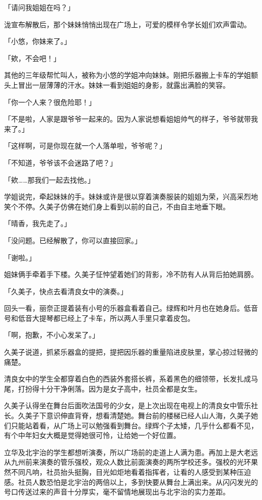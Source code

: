 \documentclass[UTF8]{ctexart}
\begin{document}
    「请问我姐姐在吗？」 

    泷宣布解散后，那个妹妹悄悄出现在广场上，可爱的模样令学长姐们欢声雷动。 

    「小悠，你妹来了。」 

    「欸，不会吧！」 

    其他的三年级帮忙叫人，被称为小悠的学姐冲向妹妹。刚把乐器搬上卡车的学姐额头上冒出一层薄薄的汗水。妹妹一看到姐姐的身影，就露出满脸的笑容。 

    「你一个人来？很危险耶！」 

    「不是啦，人家是跟爷爷一起来的。因为人家说想看姐姐帅气的样子，爷爷就带我来了。」 

    「这样啊，可是你现在就一个人落单啦，爷爷呢？」 

    「不知道，爷爷该不会迷路了吧？」 

    「欸……那我们一起去找他。」 

    学姐说完，牵起妹妹的手。妹妹或许是很以穿着演奏服装的姐姐为荣，兴高采烈地笑个不停。久美子仿佛在她们身上看到以前的自己，不由自主地垂下眼。 

    「晴香，我先走了。」 

    「没问题。已经解散了，你可以直接回家。」 

    「谢啦。」 

    姐妹俩手牵着手下楼。久美子怔忡望着她们的背影，冷不防有人从背后拍她肩膀。 

    「久美子，快点去看清良女中的演奏。」 

    回头一看，丽奈正提着装有小号的乐器盒看着自己。绿辉和叶月也在她身后。低音号和低音大提琴都已经上了卡车，所以两人手里只拿着皮包。 

    「啊，抱歉，不小心发呆了。」 

    久美子说道，抓紧乐器盒的提把，提把因乐器的重量陷进皮肤里，掌心掠过轻微的痛楚。 

    清良女中的学生全都穿着白色的西装外套搭长裤，系着黑色的细领带，长发扎成马尾，打扮得十分干净俐落。因为是女子高中，社员全都是女生。 

    久美子认得坐在舞台后面吹法国号的少女，是上次出现在电视上的清良女中管乐社长。久美子下意识伸直背脊，想看清楚她。舞台前的楼梯已经人山人海，久美子她们只能站着看，从广场上可以勉强看到舞台。绿辉个子太矮，几乎什么都看不见，有个中年妇女大概是觉得她很可怜，让给她一个好位置。 

    立华及北宇治的学生都想听演奏，所以广场前的走道上人满为患。再加上是大老远从九州前来演奏的管乐强校，观众人数比前面演奏的两所学校还多。强校的光环果然不同凡响，社员抬头挺胸，目光如炬地看着指挥者，让看的人感受到某种压迫感。社员人数恐怕是北宇治的两倍以上，多到快要从舞台上满出来。从闪闪发光的号口传送过来的声音十分厚实，毫不留情地展现出与北宇治的实力差距。 
\end{document}
